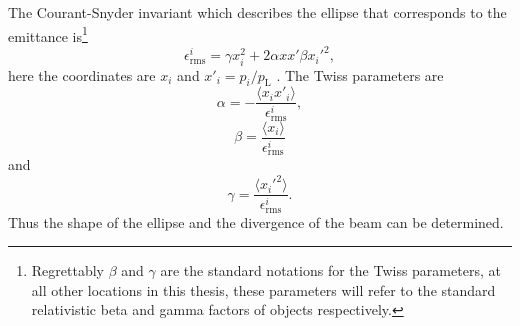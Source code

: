 The Courant-Snyder invariant which describes the ellipse that corresponds to the emittance is\footnote{Regrettably $\beta$ and $\gamma$ are the standard notations for the Twiss parameters, at all other locations in this thesis, these parameters will refer to the standard relativistic beta and gamma factors of objects respectively.}
\begin{equation}
	\epsilon^i_\mathrm{rms}  = \gamma x_i^2 + 2\alpha x x' \beta x_i'^2,
\end{equation}
here the coordinates are $x_i$ and $x'_i = p_i/p_\mathrm{L}$ \cite{wiedemann_2015_ParticleAcceleratorPhysics}. The Twiss parameters are
\begin{equation}
	\alpha = - \frac{\langle x_i x'_i \rangle}{	\epsilon^i_\mathrm{rms} },
\end{equation}
\begin{equation}
	\beta = \frac{\langle x_i \rangle}{	\epsilon^i_\mathrm{rms} }
\end{equation}
and
\begin{equation}
	\gamma = \frac{\langle x_i'^2 \rangle}{	\epsilon^i_\mathrm{rms} }.
\end{equation}
Thus the shape of the ellipse and the divergence of the beam can be determined.



